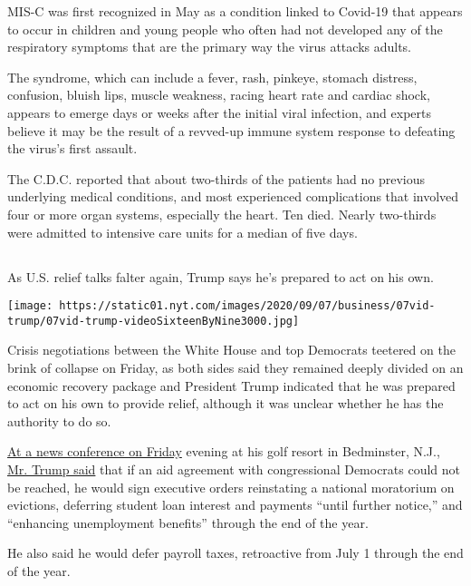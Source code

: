 MIS-C was first recognized in May as a condition linked to Covid-19 that
appears to occur in children and young people who often had not
developed any of the respiratory symptoms that are the primary way the
virus attacks adults.

The syndrome, which can include a fever, rash, pinkeye, stomach
distress, confusion, bluish lips, muscle weakness, racing heart rate and
cardiac shock, appears to emerge days or weeks after the initial viral
infection, and experts believe it may be the result of a revved-up
immune system response to defeating the virus's first assault.

The C.D.C. reported that about two-thirds of the patients had no
previous underlying medical conditions, and most experienced
complications that involved four or more organ systems, especially the
heart. Ten died. Nearly two-thirds were admitted to intensive care units
for a median of five days.

\hypertarget{section-2}{%
\subsection{}\label{section-2}}

As U.S. relief talks falter again, Trump says he's prepared to act on
his own.

\texttt{[image: https://static01.nyt.com/images/2020/09/07/business/07vid-trump/07vid-trump-videoSixteenByNine3000.jpg]}

Crisis negotiations between the White House and top Democrats teetered
on the brink of collapse on Friday, as both sides said they remained
deeply divided on an economic recovery package and President Trump
indicated that he was prepared to act on his own to provide relief,
although it was unclear whether he has the authority to do so.

\href{https://www.nytimes.com/2020/08/07/us/politics/trump-news-conference-bedminster.html}{At
a news conference on Friday} evening at his golf resort in Bedminster,
N.J.,
\href{https://www.nytimes.com/video/us/politics/100000007279339/trump-says-he-will-act-on-his-own-if-congress-doesnt-agree-on-relief.html}{Mr.
Trump said} that if an aid agreement with congressional Democrats could
not be reached, he would sign executive orders reinstating a national
moratorium on evictions, deferring student loan interest and payments
``until further notice,'' and ``enhancing unemployment benefits''
through the end of the year.

He also said he would defer payroll taxes, retroactive from July 1
through the end of the year.

